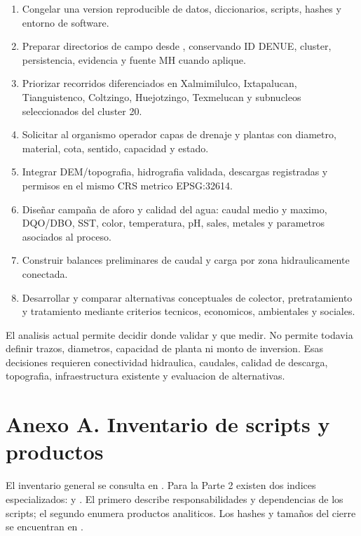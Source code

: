 \documentclass[11pt,letterpaper]{article}
\begin{document}
\begin{enumerate}
    \item Congelar una version reproducible de datos, diccionarios, scripts, hashes y entorno de software.
    \item Preparar directorios de campo desde , conservando ID DENUE, cluster, persistencia, evidencia y fuente MH cuando aplique.
    \item Priorizar recorridos diferenciados en Xalmimilulco, Ixtapalucan, Tianguistenco, Coltzingo, Huejotzingo, Texmelucan y subnucleos seleccionados del cluster 20.
    \item Solicitar al organismo operador capas de drenaje y plantas con diametro, material, cota, sentido, capacidad y estado.
    \item Integrar DEM/topografia, hidrografia validada, descargas registradas y permisos en el mismo CRS metrico EPSG:32614.
    \item Diseñar campaña de aforo y calidad del agua: caudal medio y maximo, DQO/DBO, SST, color, temperatura, pH, sales, metales y parametros asociados al proceso.
    \item Construir balances preliminares de caudal y carga por zona hidraulicamente conectada.
    \item Desarrollar y comparar alternativas conceptuales de colector, pretratamiento y tratamiento mediante criterios tecnicos, economicos, ambientales y sociales.
\end{enumerate}

\begin{alerta}
El analisis actual permite decidir donde validar y que medir. No permite todavia definir trazos, diametros, capacidad de planta ni monto de inversion. Esas decisiones requieren conectividad hidraulica, caudales, calidad de descarga, topografia, infraestructura existente y evaluacion de alternativas.
\end{alerta}

\appendix
\section{Anexo A. Inventario de scripts y productos}

El inventario general se consulta en . Para la Parte 2 existen dos indices especializados:  y . El primero describe responsabilidades y dependencias de los scripts; el segundo enumera productos analiticos. Los hashes y tamaños del cierre se encuentran en .
\end{document}
